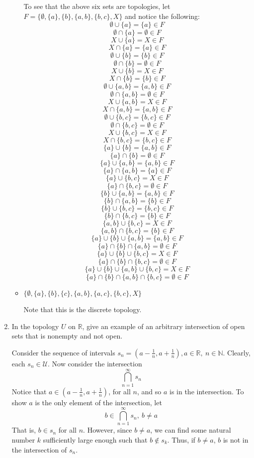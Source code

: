 \documentclass[12pt]{article}
\begin{document}
\begin{enumerate}
\begin{itemize}
    To see that the above six sets are topologies, let $F = \{\emptyset, \{a\}, \{b\}, \{a, b\}, \{b, c\}, X\}$ and notice the following:
    \[\emptyset \cup \{a\} = \{a\} \in F\]
    \[\emptyset \cap \{a\} = \emptyset \in F\]
    \[X \cup \{a\} = X \in F\]
    \[X \cap \{a\} = \{a\} \in F\]
    \[\emptyset \cup \{b\} = \{b\} \in F\]
    \[\emptyset \cap \{b\} = \emptyset \in F\]
    \[X \cup \{b\} = X \in F\]
    \[X \cap \{b\} = \{b\} \in F\]
    \[\emptyset \cup \{a,b\} = \{a,b\} \in F\]
    \[\emptyset \cap \{a,b\} = \emptyset \in F\]
    \[X \cup \{a,b\} = X \in F\]
    \[X \cap \{a,b\} = \{a,b\} \in F\]
    \[\emptyset \cup \{b,c\} = \{b,c\} \in F\]
    \[\emptyset \cap \{b,c\} = \emptyset \in F\]
    \[X \cup \{b,c\} = X \in F\]
    \[X \cap \{b,c\} = \{b,c\} \in F\]
    \[\{a\} \cup \{b\} = \{a,b\} \in F\]
    \[\{a\} \cap \{b\} = \emptyset \in F\]
    \[\{a\} \cup \{a,b\} = \{a,b\} \in F\]
    \[\{a\} \cap \{a,b\} = \{a\} \in F\]
    \[\{a\} \cup \{b,c\} = X \in F\]
    \[\{a\} \cap \{b,c\} = \emptyset \in F\]
    \[\{b\} \cup \{a,b\} = \{a,b\} \in F\]
    \[\{b\} \cap \{a,b\} = \{b\} \in F\]
    \[\{b\} \cup \{b,c\} = \{b,c\} \in F\]
    \[\{b\} \cap \{b, c\} = \{b\} \in F\]
    \[\{a,b\} \cup \{b,c\} = X \in F\]
    \[\{a,b\} \cap \{b,c\} = \{b\} \in F\]
    \[\{a\} \cup \{b\} \cup \{a,b\} = \{a,b\} \in F\]
    \[\{a\} \cap \{b\} \cap \{a,b\} = \emptyset \in F\]
    \[\{a\} \cup \{b\} \cup \{b,c\} = X \in F\]
    \[\{a\} \cap \{b\} \cap \{b,c\} = \emptyset \in F\]
    \[\{a\} \cup \{b\} \cup \{a,b\} \cup \{b,c\} = X \in F\]
    \[\{a\} \cap \{b\} \cap \{a,b\} \cap \{b,c\} = \emptyset \in F\]
    
    
    
    \item $\{\emptyset, \{a\}, \{b\}, \{c\}, \{a, b\}, \{a, c\}, \{b, c\}, X\}$
    
    Note that this is the discrete topology.
    

\end{itemize}
\item In the topology $U$ on $\mathbb{R}$, give an example of an arbitrary intersection of open sets that is nonempty and not open.

Consider the sequence of intervals $s_n = (a - \frac{1}{n}, a + \frac{1}{n}), a\in \mathbb{R},\: n \in \mathbb{N}$. Clearly, each $s_n \in \mathcal{U}$. Now consider the intersection
\[\bigcap_{n=1}^{\infty} s_n\]
Notice that $a \in (a - \frac{1}{n}, a + \frac{1}{n})$, for all $n$, and so $a$ is in the intersection. To show $a$ is the only element of the intersection, let 
\[b \in \bigcap_{n=1}^{\infty} s_n, \: b \neq a\]
That is, $b \in s_n$ for all $n$. However, since $b \neq a$, we can find some natural number $k$ sufficiently large enough such that $b \notin s_k$.
Thus, if $b \neq a$, $b$ is not in the intersection of $s_n$. 


\end{enumerate}
\end{document}
